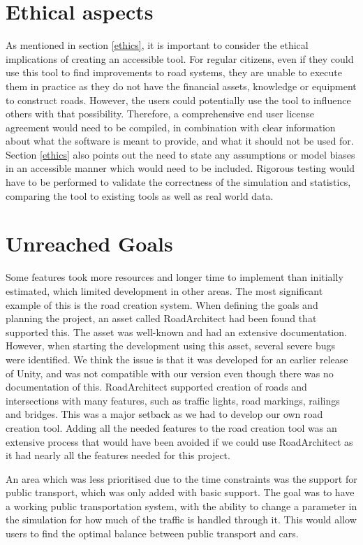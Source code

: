 \section{Ethical aspects}
    As mentioned in section \ref{ethics}, it is important to consider the ethical implications of creating an accessible tool. For regular citizens, even if they could use this tool to find improvements to road systems, they are unable to execute them in practice as they do not have the financial assets, knowledge or equipment to construct roads. However, the users could potentially use the tool to influence others with that possibility. Therefore, a comprehensive end user license agreement would need to be compiled, in combination with clear information about what the software is meant to provide, and what it should not be used for. Section \ref{ethics} also points out the need to state any assumptions or model biases in an accessible manner which would need to be included. Rigorous testing would have to be performed to validate the correctness of the simulation and statistics, comparing the tool to existing tools as well as real world data.


\section{Unreached Goals}
    Some features took more resources and longer time to implement than initially estimated, which limited development in other areas. The most significant example of this is the road creation system. When defining the goals and planning the project, an asset called RoadArchitect had been found that supported this\cite{road-architect}. The asset was well-known and had an extensive documentation. However, when starting the development using this asset, several severe bugs were identified. We think the issue is that it was developed for an earlier release of Unity, and was not compatible with our version even though there was no documentation of this. RoadArchitect supported creation of roads and intersections with many features, such as traffic lights, road markings, railings and bridges. This was a major setback as we had to develop our own road creation tool. Adding all the needed features to the road creation tool was an extensive process that would have been avoided if we could use RoadArchitect as it had nearly all the features needed for this project.

    An area which was less prioritised due to the time constraints was the support for public transport, which was only added with basic support. The goal was to have a working public transportation system, with the ability to change a parameter in the simulation for how much of the traffic is handled through it. This would allow users to find the optimal balance between public transport and cars.

